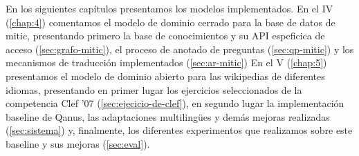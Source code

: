 En los siguientes capítulos presentamos los modelos implementados. En el IV (\ref{chap:4}) comentamos el modelo de dominio cerrado para la base de datos de mitic, presentando primero la base de conocimientos y su API espeficica de acceso (\ref{sec:grafo-mitic}), el proceso de anotado de preguntas (\ref{sec:qp-mitic}) y los mecanismos de traducción implementados (\ref{sec:ar-mitic})
En el V (\ref{chap:5}) presentamos el modelo de dominio abierto para las wikipedias de diferentes idiomas, presentando en primer lugar los ejercicios seleccionados de la competencia Clef '07 (\ref{sec:ejecicio-de-clef}), en segundo lugar la implementación baseline de Qanus, las adaptaciones multilingües y demás mejoras realizadas (\ref{sec:sistema}) y, finalmente, los diferentes experimentos que realizamos sobre este baseline y sus mejoras (\ref{sec:eval}).

\faltadependiente

